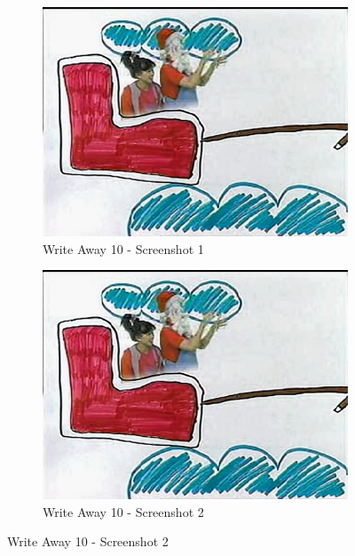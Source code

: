 \begin{figure}[H]
    \centering
    \begin{subfigure}{0.45\textwidth}
        \centering
        \includegraphics[width=\linewidth]{Games/WriteAway/Images/WriteAway10Screenshot1.png}
        \caption{Write Away 10 - Screenshot 1}
        \label{fig:sub1}
    \end{subfigure}
    \begin{subfigure}{0.45\textwidth}
        \centering
        \includegraphics[width=\linewidth]{Games/WriteAway/Images/WriteAway10Screenshot1.png}
        \caption{Write Away 10 - Screenshot 2}
        \label{fig:sub2}
    \end{subfigure}


\end{figure}
